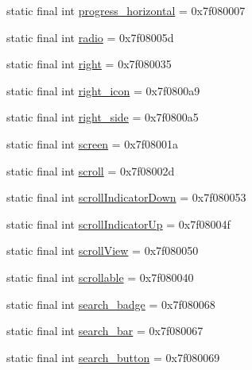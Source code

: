 \begin{CompactItemize}
static final int \hyperlink{classandroid_1_1support_1_1v7_1_1recyclerview_1_1_r_1_1id_e2c7b95988c45e8a66c08becfb56259c}{progress\_\-horizontal} = 0x7f080007
\item 
static final int \hyperlink{classandroid_1_1support_1_1v7_1_1recyclerview_1_1_r_1_1id_ff70d047362d52847841e5650b9966dc}{radio} = 0x7f08005d
\item 
static final int \hyperlink{classandroid_1_1support_1_1v7_1_1recyclerview_1_1_r_1_1id_3fa19d79c2e0ee754eef3a352190d6f2}{right} = 0x7f080035
\item 
static final int \hyperlink{classandroid_1_1support_1_1v7_1_1recyclerview_1_1_r_1_1id_1a16511ab429538d0b8607ad4e85c692}{right\_\-icon} = 0x7f0800a9
\item 
static final int \hyperlink{classandroid_1_1support_1_1v7_1_1recyclerview_1_1_r_1_1id_1bac6b3f55db627066feb11a085c1442}{right\_\-side} = 0x7f0800a5
\item 
static final int \hyperlink{classandroid_1_1support_1_1v7_1_1recyclerview_1_1_r_1_1id_cc20af10128a1dfae9341d01ef64d6a3}{screen} = 0x7f08001a
\item 
static final int \hyperlink{classandroid_1_1support_1_1v7_1_1recyclerview_1_1_r_1_1id_85b52f28e0d189209ef01594ee2a3b67}{scroll} = 0x7f08002d
\item 
static final int \hyperlink{classandroid_1_1support_1_1v7_1_1recyclerview_1_1_r_1_1id_fb40c7c0724922537ccd037c52055a3d}{scrollIndicatorDown} = 0x7f080053
\item 
static final int \hyperlink{classandroid_1_1support_1_1v7_1_1recyclerview_1_1_r_1_1id_d81f8397b176b5c3e488c2d45641efa8}{scrollIndicatorUp} = 0x7f08004f
\item 
static final int \hyperlink{classandroid_1_1support_1_1v7_1_1recyclerview_1_1_r_1_1id_71f289c2a440e2828dc7a0e88c47c331}{scrollView} = 0x7f080050
\item 
static final int \hyperlink{classandroid_1_1support_1_1v7_1_1recyclerview_1_1_r_1_1id_d17fa2a4e54c0476c5fdaada2b8d8519}{scrollable} = 0x7f080040
\item 
static final int \hyperlink{classandroid_1_1support_1_1v7_1_1recyclerview_1_1_r_1_1id_1653d2a7bd1ecf9219ead3333872876e}{search\_\-badge} = 0x7f080068
\item 
static final int \hyperlink{classandroid_1_1support_1_1v7_1_1recyclerview_1_1_r_1_1id_2907c65ccfd4e1e22912434509bf5680}{search\_\-bar} = 0x7f080067
\item 
static final int \hyperlink{classandroid_1_1support_1_1v7_1_1recyclerview_1_1_r_1_1id_b9b55e66f297efbd78f2f349f8b9fb26}{search\_\-button} = 0x7f080069

\end{CompactItemize}
